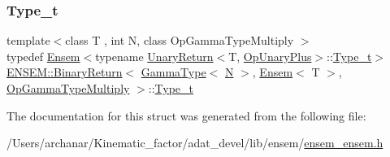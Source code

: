 \subsubsection{\texorpdfstring{Type\_t}{Type\_t}\hspace{0.1cm}{\footnotesize\ttfamily [2/2]}}
{\footnotesize\ttfamily template$<$class T , int N, class Op\+Gamma\+Type\+Multiply $>$ \\
typedef \mbox{\hyperlink{classENSEM_1_1Ensem}{Ensem}}$<$typename \mbox{\hyperlink{structENSEM_1_1UnaryReturn}{Unary\+Return}}$<$T, \mbox{\hyperlink{structENSEM_1_1OpUnaryPlus}{Op\+Unary\+Plus}}$>$\+::\mbox{\hyperlink{structENSEM_1_1BinaryReturn_3_01GammaType_3_01N_01_4_00_01Ensem_3_01T_01_4_00_01OpGammaTypeMultiply_01_4_adac71026bdd760ed5ab7f1bc1bab2d5a}{Type\+\_\+t}}$>$ \mbox{\hyperlink{structENSEM_1_1BinaryReturn}{E\+N\+S\+E\+M\+::\+Binary\+Return}}$<$ \mbox{\hyperlink{classENSEM_1_1GammaType}{Gamma\+Type}}$<$ \mbox{\hyperlink{operator__name__util_8cc_a7722c8ecbb62d99aee7ce68b1752f337}{N}} $>$, \mbox{\hyperlink{classENSEM_1_1Ensem}{Ensem}}$<$ T $>$, \mbox{\hyperlink{structENSEM_1_1OpGammaTypeMultiply}{Op\+Gamma\+Type\+Multiply}} $>$\+::\mbox{\hyperlink{structENSEM_1_1BinaryReturn_3_01GammaType_3_01N_01_4_00_01Ensem_3_01T_01_4_00_01OpGammaTypeMultiply_01_4_adac71026bdd760ed5ab7f1bc1bab2d5a}{Type\+\_\+t}}}



The documentation for this struct was generated from the following file\+:\begin{DoxyCompactItemize}
\item 
/\+Users/archanar/\+Kinematic\+\_\+factor/adat\+\_\+devel/lib/ensem/\mbox{\hyperlink{lib_2ensem_2ensem__ensem_8h}{ensem\+\_\+ensem.\+h}}\end{DoxyCompactItemize}

